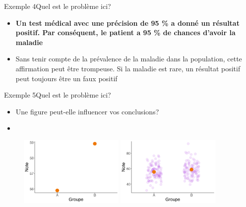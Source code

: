 \documentclass[xcolor=dvipsnames, onlymath, 10pt, aspectratio=169, handout]{beamer}
\begin{document}

\begin{frame}{Exemple 4}{Quel est le problème ici?}
	\label{maladie}
	\begin{important}
		\begin{itemize}
			\item[] \textbf{Un test médical avec une précision de 95 \% a donné un résultat positif. Par conséquent, le patient a 95 \% de chances d'avoir la maladie}
			      \pause
			\item[\winner] Sans tenir compte de la prévalence de la maladie dans la population, cette affirmation peut être trompeuse. Si la maladie est rare, un résultat positif peut toujours être un faux positif
		\end{itemize}
	\end{important}


\end{frame}


\begin{frame}{Exemple 5}{Quel est le problème ici?}

	\begin{itemize}
		\item Une figure peut-elle influencer vos conclusions?
		\item[]
	\end{itemize}

	\begin{center}
		\begin{figure}
			\includegraphics[width=0.45\textwidth]{1.jpeg}
			\pause
			\includegraphics[width=0.45\textwidth]{2.jpeg}
		\end{figure}
	\end{center}

\end{frame}
\end{document}
